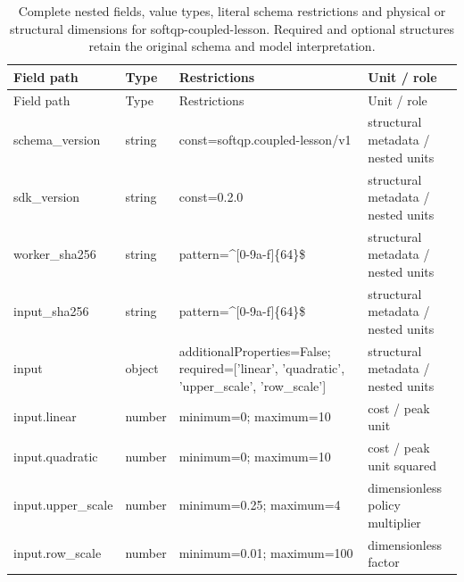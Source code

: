\begingroup\footnotesize\setlength{\tabcolsep}{3pt}
\begin{longtable}{@{}>{\raggedright\arraybackslash}p{}>{\raggedright\arraybackslash}p{}>{\raggedright\arraybackslash}p{}>{\raggedright\arraybackslash}p{}@{}}
\caption{Complete nested fields, value types, literal schema restrictions and physical or structural dimensions for softqp-coupled-lesson. Required and optional structures retain the original schema and model interpretation.}\label{tab:nested-softqp-coupled-lesson}\\
\toprule Field path & Type & Restrictions & Unit / role\\\midrule\endfirsthead
\toprule Field path & Type & Restrictions & Unit / role\\\midrule\endhead
\bottomrule\endfoot
schema\_\allowbreak{}version & string & const=\allowbreak{}softqp.\allowbreak{}coupled-\allowbreak{}lesson/\allowbreak{}v1 & structural metadata /\allowbreak{} nested units\\
sdk\_\allowbreak{}version & string & const=\allowbreak{}0.\allowbreak{}2.\allowbreak{}0 & structural metadata /\allowbreak{} nested units\\
worker\_\allowbreak{}sha256 & string & pattern=\allowbreak{}\textasciicircum{}[0-9a-\allowbreak{}f]\{64\}\$ & structural metadata /\allowbreak{} nested units\\
input\_\allowbreak{}sha256 & string & pattern=\allowbreak{}\textasciicircum{}[0-9a-\allowbreak{}f]\{64\}\$ & structural metadata /\allowbreak{} nested units\\
input & object & additionalProperties=\allowbreak{}False; required=\allowbreak{}['linear', 'quadratic', 'upper\_\allowbreak{}scale', 'row\_\allowbreak{}scale'] & structural metadata /\allowbreak{} nested units\\
input.\allowbreak{}linear & number & minimum=\allowbreak{}0; maximum=\allowbreak{}10 & cost /\allowbreak{} peak unit\\
input.\allowbreak{}quadratic & number & minimum=\allowbreak{}0; maximum=\allowbreak{}10 & cost /\allowbreak{} peak unit squared\\
input.\allowbreak{}upper\_\allowbreak{}scale & number & minimum=\allowbreak{}0.\allowbreak{}25; maximum=\allowbreak{}4 & dimensionless policy multiplier\\
input.\allowbreak{}row\_\allowbreak{}scale & number & minimum=\allowbreak{}0.\allowbreak{}01; maximum=\allowbreak{}100 & dimensionless factor\\

\end{longtable}
